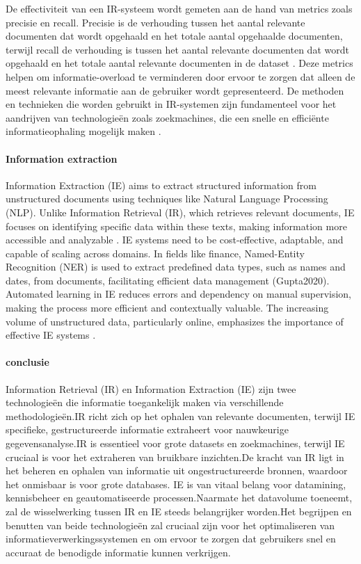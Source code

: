 De effectiviteit van een IR-systeem wordt gemeten aan de hand van metrics zoals precisie en recall. Precisie is de verhouding tussen het aantal relevante documenten dat wordt opgehaald en het totale aantal opgehaalde documenten, terwijl recall de verhouding is tussen het aantal relevante documenten dat wordt opgehaald en het totale aantal relevante documenten in de dataset \autocite{Javija2024}. Deze metrics helpen om informatie-overload te verminderen door ervoor te zorgen dat alleen de meest relevante informatie aan de gebruiker wordt gepresenteerd. De methoden en technieken die worden gebruikt in IR-systemen zijn fundamenteel voor het aandrijven van technologieën zoals zoekmachines, die een snelle en efficiënte informatieophaling mogelijk maken \autocite{Krallinger2024}.
\paragraph{Information extraction}
Information Extraction (IE) aims to extract structured information from unstructured documents using techniques like Natural Language Processing (NLP). Unlike Information Retrieval (IR), which retrieves relevant documents, IE focuses on identifying specific data within these texts, making information more accessible and analyzable \autocite{Javija2024}. IE systems need to be cost-effective, adaptable, and capable of scaling across domains. In fields like finance, Named-Entity Recognition (NER) is used to extract predefined data types, such as names and dates, from documents, facilitating efficient data management (Gupta2020). Automated learning in IE reduces errors and dependency on manual supervision, making the process more efficient and contextually valuable. The increasing volume of unstructured data, particularly online, emphasizes the importance of effective IE systems \autocite{Javija2024}.


\paragraph{conclusie}
Information Retrieval (IR) en Information Extraction (IE) zijn twee technologieën die informatie toegankelijk maken via verschillende methodologieën.IR richt zich op het ophalen van relevante documenten, terwijl IE specifieke, gestructureerde informatie extraheert voor nauwkeurige gegevensanalyse.IR is essentieel voor grote datasets en zoekmachines, terwijl IE cruciaal is voor het extraheren van bruikbare inzichten.De kracht van IR ligt in het beheren en ophalen van informatie uit ongestructureerde bronnen, waardoor het onmisbaar is voor grote databases. IE is van vitaal belang voor datamining, kennisbeheer en geautomatiseerde processen.Naarmate het datavolume toeneemt, zal de wisselwerking tussen IR en IE steeds belangrijker worden.Het begrijpen en benutten van beide technologieën zal cruciaal zijn voor het optimaliseren van informatieverwerkingssystemen en om ervoor te zorgen dat gebruikers snel en accuraat de benodigde informatie kunnen verkrijgen.

